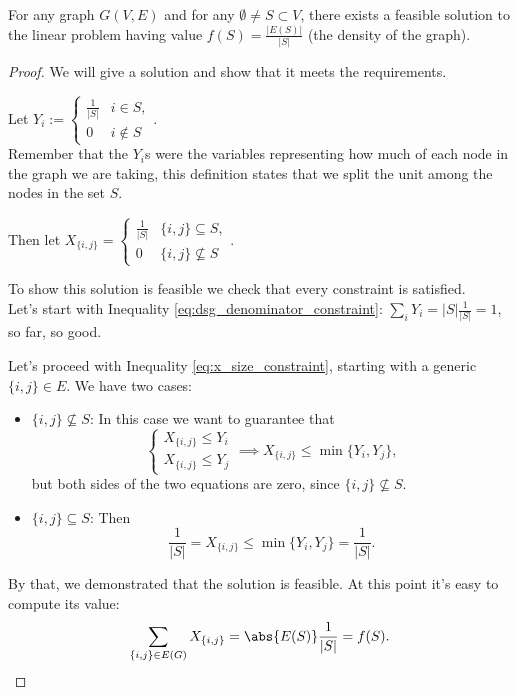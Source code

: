 \begin{lem}\label{l:dsp-feasibility}
    For any graph $G(V,E)$ and for any $\emptyset \neq S \subset V$, there exists a feasible solution to the linear problem having value $f(S)=\frac{|E(S)|}{|S|}$ (the density of the graph).
\end{lem}
\begin{proof}
    We will give a solution and show that it meets the requirements.
    
    Let $Y_i :=
    \begin{cases}
    \frac{1}{|S|} & i \in S,\\
    0 & i \not\in S
    \end{cases}$.\\
    Remember that the $Y_i$s were the variables representing how much of each node in the graph we are taking, this definition states that we split the unit among the nodes in the set $S$.
    
    Then let $X_{\{i, j\}} = 
    \begin{cases}
    \frac{1}{|S|} & \{i, j\} \subseteq S,\\
    0 & \{i, j\} \not\subseteq S
    \end{cases}$.
    
    To show this solution is feasible we check that every constraint is satisfied.\\
    Let's start with Inequality \ref{eq:dsg_denominator_constraint}:
    $\sum_{i} Y_i = |S| \frac{1}{|S|} = 1$, 
    so far, so good.
    
    Let's proceed with Inequality \ref{eq:x_size_constraint}, starting with a generic $\{i, j\} \in E$. We have two cases:
    \begin{itemize}
        \item $\{i, j\} \not\subseteq S$: In this case we want to guarantee that
        \begin{equation}
            \begin{cases}
                X_{\{i, j\}} \leq Y_i\\
                X_{\{i, j\}} \leq Y_j
            \end{cases}
            \implies X_{\{i, j\}} \leq \min{\{Y_i, Y_j\}},
        \end{equation}
        but both sides of the two equations are zero, since $\{i, j\} \not\subseteq S$.
        
        \item $\{i, j\} \subseteq S$: Then
        \begin{equation}
            \frac{1}{|S|} = X_{\{i, j\}} \leq  \min{\{Y_i, Y_j\}} = \frac{1}{|S|}.
        \end{equation}
    \end{itemize}
    
    By that, we demonstrated that the solution is feasible. At this point it's easy to compute its value:
    \begin{equation}
    \sum_{\{i, j\} \in E(G)} X_{\{i, j\}}= \abs{E(S)} \frac{1}{|S|} = f(S).
    \end{equation}
\end{proof}

